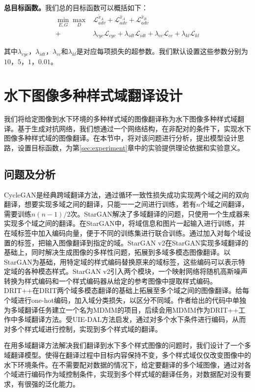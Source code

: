 \textbf{总目标函数。}我们总的目标函数可以概括如下：
\begin{equation}
\label{equ:full}
\begin{aligned}
\min_{E,G}\max_{D} & \mathcal{L}_{adv}^{\tilde{x}_A}+\mathcal{L}_{adv}^{\hat{x}_A}+\mathcal{L}_{adv}^{\hat{x}_B} \\
+&\lambda_{cyc}\mathcal{L}_{cyc}+\lambda_{idt}\mathcal{L}_{idt}+\lambda_{cc}\mathcal{L}_{cc}+\lambda_{kl}\mathcal{L}_{kl}
\end{aligned}
\end{equation}

其中$\lambda_{cyc}$，$\lambda_{idt}$，$\lambda_{cc}$和$\lambda_{kl}$是对应每项损失的超参数。我们默认设置这些参数分别为$10$，$5$，$1$，$0.01$。

\section{水下图像多种样式域翻译设计}
我们将给定图像到水下环境的多种样式域的图像翻译称为水下图像多种样式域翻译。基于生成对抗网络，我们想通过一个网络结构，在非配对的条件下，实现水下图像多种样式域的图像翻译。在本节中，将对该问题进行分析，提出模型设计思路，设置目标函数，为第\ref{sec:experiment}章中的实验提供理论依据和实验意义。

\subsection{问题及分析}

CycleGAN是经典跨域翻译方法，通过循环一致性损失成功实现两个域之间的双向翻译，想要实现多域之间的翻译，只能一一之间进行训练，若有$n$个域之间翻译，需要训练$n(n-1)/2$次。StarGAN解决了多域翻译的问题，只使用一个生成器来实现多个域之间的翻译。在StarGAN中，将域信息和图片一起输入进行训练，并在域标签中加入编码向量，便于不同的训练集进行联合训练。通过加入对每个域设置的标签，把输入图像翻译到指定的域。StarGAN v2在StarGAN实现多域翻译的基础上，同时解决生成图像的多样性问题，拓展到多域多模态图像翻译。以StarGAN为基础，用特定域的样式编码替换原来的域标签，这些编码可以表示特定域的各种模态样式。StarGAN v2引入两个模块，一个映射网络将随机高斯噪声转换为样式编码和一个样式编码器从给定的参考图像中提取样式编码。DRIT++在DRIT两个域多模态翻译的基础上拓展至多个域之间的图像翻译。给每个域进行one-hot编码，加入域分类损失，以区分不同域。作者给出的代码中单独为多域翻译任务建立一个名为MDMM的项目，后续会用MDMM作为DRIT++工作中多域翻译方法。受UIE-DAL方法启发，通过对多个水下条件进行编码，从而对多个样式域进行控制，实现到多个样式域的翻译。

在用多域翻译方法解决我们翻译到水下多个样式图像的问题时，我们设计了一个多域翻译模型。使得在翻译过程中目标内容保持不变，多个样式域仅仅改变图像中的水下环境条件。在不需要配对数据的情况下，给定要翻译的多个域图像，通过对各个域进行编码作为域控制条件，实现到多个样式域的翻译任务，对数据配对没有要求，有很强的泛化能力。

